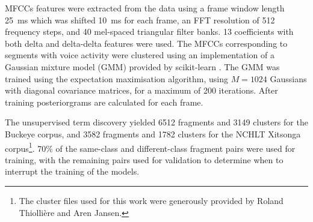 MFCCs features were extracted from the data using a frame window length \SI{25}{\ms} which was shifted \SI{10}{\ms} for each frame, an FFT resolution of 512 frequency steps, and 40 mel-spaced triangular filter banks.
13 coefficients with both delta and delta-delta features were used.
The MFCCs corresponding to segments with voice activity were clustered using an implementation of a Gaussian mixture model (GMM) provided by scikit-learn \parencite{scikit-learn}.
The GMM was trained using the expectation maximisation algorithm, using $M = 1024$ Gaussians with diagonal covariance matrices, for a maximum of 200 iterations.
After training posteriorgrams are calculated for each frame.

The unsupervised term discovery yielded 6512 fragments and 3149 clusters for the Buckeye corpus, and 3582 fragments and 1782 clusters for the NCHLT Xitsonga corpus\footnote{The cluster files used for this work were generously provided by Roland Thiollière and Aren Jansen.}.
70\% of the same-class and different-class fragment pairs were used for training, with the remaining pairs used for validation to determine when to interrupt the training of the models.



